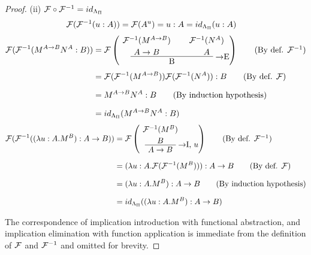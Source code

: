 \begin{proof}
\noindent (ii) $\mathcal{F} \circ \mathcal{F}^{-1} = id_{\Lambda_\Pi}$
\begin{align*}
\mathcal{F}(\mathcal{F}^{-1}(u:A)) & = \mathcal{F}(A^u) = u:A = id_{\Lambda_\Pi}(u:A)
\end{align*}
\begin{align*}
\chmap(\chmapanta(M^{A \to B}N^A:B)) & =
  \chmap\left(
  \AxiomC{$\chmapanta(M^{A \to B})$}
  \noLine
  \UnaryInfC{$A \to B$}
  \AxiomC{$\chmapanta(N^A)$}
  \noLine
  \UnaryInfC{$A$}
  \RightLabel{$\to$E}
  \BinaryInfC{B}
  \DisplayProof
  \right) \tag{By def. $\chmapanta$}\\[4pt]
& =
  \chmap(\chmapanta(M^{A \to B}))\chmap(\chmapanta(N^A)): B
  \tag{By def.  $\chmap$}\\[6pt]
& =
  M^{A \to B}N^A:B
  \tag{By induction hypothesis}\\[6pt]
& =
  id_{\stlambdaterms}(M^{A \to B}N^A:B)
\end{align*}
\begin{align*}
\chmap(\chmapanta((\lambda u:A.M^B):A \to B)) &=
  \chmap\left(
  \AxiomC{$\chmapanta(M^B)$}
  \noLine
  \UnaryInfC{$B$}
  \RightLabel{$\to$I, $u$}
  \UnaryInfC{$A \to B$}
  \DisplayProof
  \right) \tag{By def. $\chmapanta$} \\[6pt]
& =
  (\lambda u: A.\chmap(\chmapanta(M^B))): A \to B
  \tag{By def. $\chmap$} \\[6pt]
& =
  (\lambda u: A.M^B): A \to B
  \tag{By induction hypothesis} \\[6pt]
& =
  id_{\stlambdaterms}((\lambda u: A.M^B): A \to B)
\end{align*}

The correspondence of implication introduction with functional abstraction, and
implication elimination with function application is immediate from the
definition of $\mathcal{F}$ and $\mathcal{F}^{-1}$ and omitted for brevity.
\end{proof}
